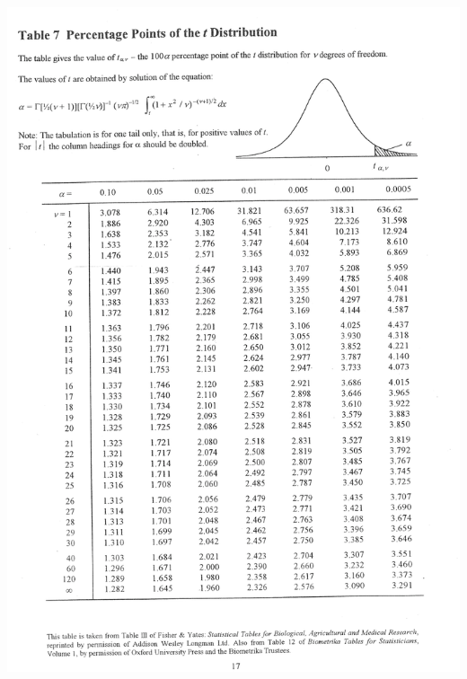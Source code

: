 \documentclass[12pt]{article}
\begin{document}
\begin{adjustwidth}{-1cm}{0cm}
\includegraphics[width=1.1\textwidth, trim = 1cm 1cm 1cm 1cm, clip]{mdt}
\end{adjustwidth}

\newpage
\end{document}
